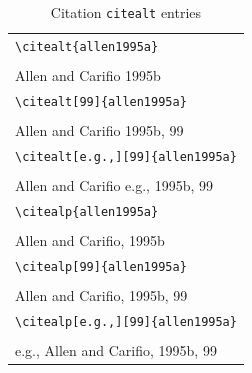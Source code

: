 ﻿\documentclass{article}
\begin{document}
\begin{table}
\begin{center}
\begin{tabular}{l}
    \verb#\citealt{allen1995a}# \\
    \citealt{allen1995a} \\
    Allen and Carifio 1995b\\
\hline
    \verb#\citealt[99]{allen1995a}# \\
    \citealt[99]{allen1995a} \\
    Allen and Carifio 1995b, 99\\
\hline
    \verb#\citealt[e.g.,][99]{allen1995a}# \\
    \citealt[e.g.,][99]{allen1995a} \\
    Allen and Carifio e.g., 1995b, 99\\
\hline
\hline
\verb#\citealp{allen1995a}# \\
    \citealp{allen1995a} \\
    Allen and Carifio, 1995b\\
\hline
    \verb#\citealp[99]{allen1995a}# \\
    \citealp[99]{allen1995a} \\
    Allen and Carifio, 1995b, 99\\
\hline
    \verb#\citealp[e.g.,][99]{allen1995a}# \\
    \citealp[e.g.,][99]{allen1995a} \\
    e.g., Allen and Carifio, 1995b, 99\\
\end{tabular}
\end{center}
\caption{Citation \texttt{citealt} entries}
\end{table}




%
\end{document}
